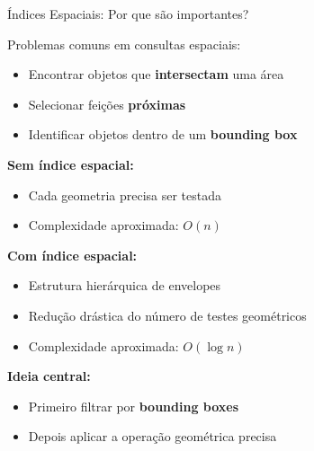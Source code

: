 \documentclass{beamer}
\begin{document}
\begin{frame}{Índices Espaciais: Por que são importantes?}
    
    Problemas comuns em consultas espaciais:
    
    \begin{itemize}
        \item Encontrar objetos que \textbf{intersectam} uma área
        \item Selecionar feições \textbf{próximas}
        \item Identificar objetos dentro de um \textbf{bounding box}
    \end{itemize}
    
    \textbf{Sem índice espacial:}
    
    \begin{itemize}
        \item Cada geometria precisa ser testada
        \item Complexidade aproximada: $O(n)$
    \end{itemize}
    
    \textbf{Com índice espacial:}
    
    \begin{itemize}
        \item Estrutura hierárquica de envelopes
        \item Redução drástica do número de testes geométricos
        \item Complexidade aproximada: $O(\log n)$
    \end{itemize}
    
    \vspace{0.4cm}
    
    \textbf{Ideia central:}
    \begin{itemize}
        \item Primeiro filtrar por \textbf{bounding boxes}
        \item Depois aplicar a operação geométrica precisa
    \end{itemize}
    
\end{frame}
\end{document}
